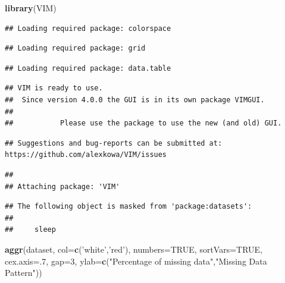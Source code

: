 \documentclass[]{book}
\newenvironment{Shaded}{\begin{snugshade}}{\end{snugshade}}
\newcommand{\KeywordTok}[1]{\textcolor[rgb]{0.13,0.29,0.53}{\textbf{#1}}}
\newcommand{\DataTypeTok}[1]{\textcolor[rgb]{0.13,0.29,0.53}{#1}}
\newcommand{\DecValTok}[1]{\textcolor[rgb]{0.00,0.00,0.81}{#1}}
\newcommand{\StringTok}[1]{\textcolor[rgb]{0.31,0.60,0.02}{#1}}
\newcommand{\OtherTok}[1]{\textcolor[rgb]{0.56,0.35,0.01}{#1}}
\newcommand{\NormalTok}[1]{#1}
\theoremstyle{definition}
\theoremstyle{definition}
\theoremstyle{definition}
\theoremstyle{remark}
\begin{document}
\begin{Shaded}
\begin{Highlighting}[]
\KeywordTok{library}\NormalTok{(VIM)}
\end{Highlighting}
\end{Shaded}

\begin{verbatim}
## Loading required package: colorspace
\end{verbatim}

\begin{verbatim}
## Loading required package: grid
\end{verbatim}

\begin{verbatim}
## Loading required package: data.table
\end{verbatim}

\begin{verbatim}
## VIM is ready to use. 
##  Since version 4.0.0 the GUI is in its own package VIMGUI.
## 
##           Please use the package to use the new (and old) GUI.
\end{verbatim}

\begin{verbatim}
## Suggestions and bug-reports can be submitted at: https://github.com/alexkowa/VIM/issues
\end{verbatim}

\begin{verbatim}
## 
## Attaching package: 'VIM'
\end{verbatim}

\begin{verbatim}
## The following object is masked from 'package:datasets':
## 
##     sleep
\end{verbatim}

\begin{Shaded}
\begin{Highlighting}[]
\KeywordTok{aggr}\NormalTok{(dataset, }\DataTypeTok{col=}\KeywordTok{c}\NormalTok{(}\StringTok{'white'}\NormalTok{,}\StringTok{'red'}\NormalTok{), }\DataTypeTok{numbers=}\OtherTok{TRUE}\NormalTok{, }\DataTypeTok{sortVars=}\OtherTok{TRUE}\NormalTok{, }\DataTypeTok{cex.axis=}\NormalTok{.}\DecValTok{7}\NormalTok{, }\DataTypeTok{gap=}\DecValTok{3}\NormalTok{, }\DataTypeTok{ylab=}\KeywordTok{c}\NormalTok{(}\StringTok{"Percentage of missing data"}\NormalTok{,}\StringTok{"Missing Data Pattern"}\NormalTok{))}
\end{Highlighting}
\end{Shaded}
\end{document}
